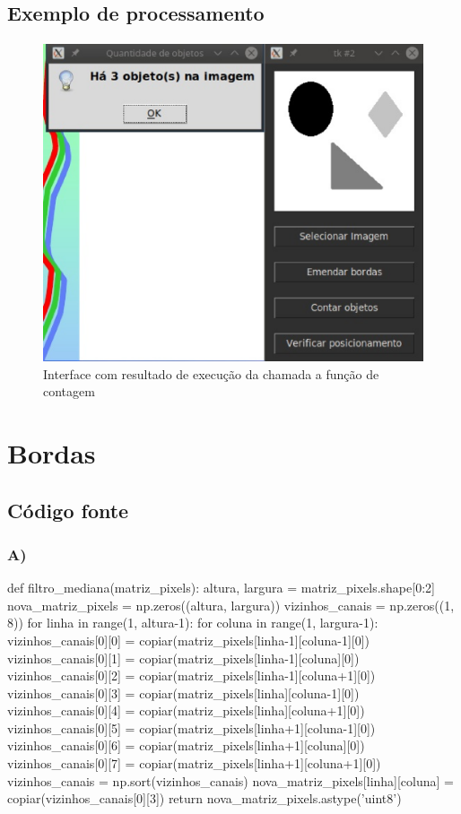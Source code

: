 \documentclass[a4paper,12pt]{article}
\begin{document}
\subsection{Exemplo de processamento}
\paragraph{}
\begin{figure}[!h]
  \includegraphics[scale=0.70]{cap_2.eps}
  \caption{Interface com resultado de execução da chamada a função de contagem}
\end{figure}

\section{Bordas}
\subsection{Código fonte}
\subsubsection{A)}
\begin{python}
def filtro_mediana(matriz_pixels):
   altura, largura = matriz_pixels.shape[0:2]
   nova_matriz_pixels = np.zeros((altura, largura))
   vizinhos_canais = np.zeros((1, 8))
   for linha in range(1, altura-1):
     for coluna in range(1, largura-1):
       vizinhos_canais[0][0] = copiar(matriz_pixels[linha-1][coluna-1][0])
       vizinhos_canais[0][1] = copiar(matriz_pixels[linha-1][coluna][0])
       vizinhos_canais[0][2] = copiar(matriz_pixels[linha-1][coluna+1][0])
       vizinhos_canais[0][3] = copiar(matriz_pixels[linha][coluna-1][0])
       vizinhos_canais[0][4] = copiar(matriz_pixels[linha][coluna+1][0])
       vizinhos_canais[0][5] = copiar(matriz_pixels[linha+1][coluna-1][0])
       vizinhos_canais[0][6] = copiar(matriz_pixels[linha+1][coluna][0])
       vizinhos_canais[0][7] = copiar(matriz_pixels[linha+1][coluna+1][0])
       vizinhos_canais = np.sort(vizinhos_canais)
       nova_matriz_pixels[linha][coluna] = copiar(vizinhos_canais[0][3])
   return nova_matriz_pixels.astype('uint8')
\end{python}
\end{document}
